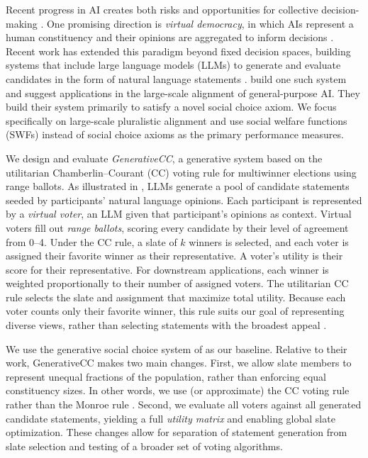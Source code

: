 \documentclass[letterpaper]{article} %
\begin{document}
Recent progress in AI creates both risks and opportunities for collective decision-making \citep{landemore}.
One promising direction is \emph{virtual democracy}, in which AIs represent a human constituency and their opinions are aggregated to inform decisions \citep{noothigattu-2018, kahng-virtual-democracy, freedman-kidney-exchange}.
Recent work has extended this paradigm beyond fixed decision spaces, building systems that include large language models (LLMs) to generate and evaluate candidates in the form of natural language statements \citep{bakker-consensus, habermas-machine, gsc-next-gen}.
\citet{fish-v2} build one such system and suggest applications in the large-scale alignment of general-purpose AI.
They build their system primarily to satisfy a novel social choice axiom.
We focus specifically on large-scale pluralistic alignment and use social welfare functions (SWFs) instead of social choice axioms as the primary performance measures.

We design and evaluate \emph{GenerativeCC}, a generative system based on the utilitarian Chamberlin--Courant (CC) voting rule for multiwinner elections \citep{chamberlin-courant} using range ballots.
As illustrated in , LLMs generate a pool of candidate statements seeded by participants' natural language opinions.
Each participant is represented by a \emph{virtual voter}, an LLM given that participant's opinions as context.
Virtual voters fill out \emph{range ballots}, scoring every candidate by their level of agreement from 0--4.
Under the CC rule, a slate of \(k\) winners is selected, and each voter is assigned their favorite winner as their representative.
A voter's utility is their score for their representative.
For downstream applications, each winner is weighted proportionally to their number of assigned voters.
The utilitarian CC rule selects the slate and assignment that maximize total utility.
Because each voter counts only their favorite winner, this rule suits our goal of representing diverse views, rather than selecting statements with the broadest appeal \citep{faliszewski-multiwinner-2017, lu-boutilier-2011}.

We use the generative social choice system of \citet{fish-v2} as our baseline.
Relative to their work, GenerativeCC makes two main changes.
First, we allow slate members to represent unequal fractions of the population, rather than enforcing equal constituency sizes. In other words, we use (or approximate) the CC voting rule rather than the Monroe rule \citep{monroe-1995}.
Second, we evaluate all voters against all generated candidate statements, yielding a full \emph{utility matrix} and enabling global slate optimization.
These changes allow for separation of statement generation from slate selection and testing of a broader set of voting algorithms.
\end{document}
